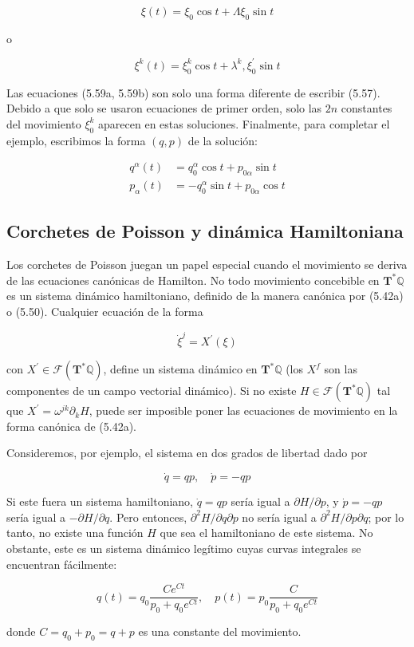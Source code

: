 \[
\xi(t) = \xi_{0} \cos t + \Lambda \xi_{0} \sin t \tag{5.59a}
\]

o

\[
\xi^{k}(t) = \xi_{0}^{k} \cos t + \lambda^{k}, \xi_{0}^{\prime} \sin t \tag{5.59~b}
\]

Las ecuaciones (5.59a, 5.59b) son solo una forma diferente de escribir (5.57). Debido a que solo se usaron ecuaciones de primer orden, solo las \( 2n \) constantes del movimiento \( \xi_{0}^{k} \) aparecen en estas soluciones. Finalmente, para completar el ejemplo, escribimos la forma \((q, p)\) de la solución:

\[
\begin{aligned}
q^{\alpha}(t) &= q_{0}^{\alpha} \cos t + p_{0 \alpha} \sin t \\
p_{\alpha}(t) &= -q_{0}^{\alpha} \sin t + p_{0 \alpha} \cos t
\end{aligned}
\]

\subsection{Corchetes de Poisson y dinámica Hamiltoniana}

Los corchetes de Poisson juegan un papel especial cuando el movimiento se deriva de las ecuaciones canónicas de Hamilton. No todo movimiento concebible en \(\mathbf{T}^{*} \mathbb{Q}\) es un sistema dinámico hamiltoniano, definido de la manera canónica por (5.42a) o (5.50). Cualquier ecuación de la forma

\[
\dot{\xi}^{j} = X^{\prime}(\xi) \tag{5.60}
\]

con \( X^{\prime} \in \mathcal{F}\left(\mathbf{T}^{*} \mathbb{Q}\right) \), define un sistema dinámico en \(\mathbf{T}^{*} \mathbb{Q}\) (los \( X^{f} \) son las componentes de un campo vectorial dinámico). Si no existe \( H \in \mathcal{F}\left(\mathbf{T}^{*} \mathbb{Q}\right) \) tal que \( X^{\prime} = \omega^{j k} \partial_{k} H \), puede ser imposible poner las ecuaciones de movimiento en la forma canónica de (5.42a).

\begin{example}
  Consideremos, por ejemplo, el sistema en dos grados de libertad dado por

\[
\dot{q} = q p, \quad \dot{p} = -q p \tag{5.61}
\]

Si este fuera un sistema hamiltoniano, \(\dot{q} = q p\) sería igual a \(\partial H / \partial p\), y \(\dot{p} = -q p\) sería igual a \(-\partial H / \partial q\). Pero entonces, \(\partial^{2} H / \partial q \partial p\) no sería igual a \(\partial^{2} H / \partial p \partial q\); por lo tanto, no existe una función \(H\) que sea el hamiltoniano de este sistema. No obstante, este es un sistema dinámico legítimo cuyas curvas integrales se encuentran fácilmente:

\[
q(t) = q_{0} \frac{C e^{C t}}{p_{0} + q_{0} e^{C t}}, \quad p(t) = p_{0} \frac{C}{p_{0} + q_{0} e^{C t}}
\]

donde \(C = q_{0} + p_{0} = q + p\) es una constante del movimiento.
\end{example}

